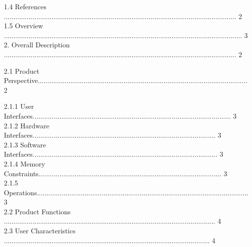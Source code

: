 \documentclass[10pt,draftclsnofoot,onecolumn]{IEEEtran}
\newcommand\tab[1][1cm]{\hspace*{#1}}
\begin{document}
                 \vspace{5mm}
     \tab 1.4 References .......................................................................................................................... 2\\
                 \vspace{5mm}
    \tab 1.5 Overview ............................................................................................................................. 3\\
                 \vspace{5mm}
2. Overall Description .......................................................................................................................... 2\\
                 \vspace{5mm}

\tab  2.1 Product Perspective.............................................................................................................. 2\\
                 \vspace{5mm}


                
\tab\tab 2.1.1 User Interfaces........................................................................................................ 3\\
                 \vspace{5mm}
\tab\tab 2.1.2 Hardware Interfaces................................................................................................ 3\\
                 \vspace{5mm}
\tab\tab 2.1.3 Software Interfaces................................................................................................. 3\\
                 \vspace{5mm}
\tab\tab 2.1.4 Memory Constraints................................................................................................ 3\\
                 \vspace{5mm}
\tab\tab 2.1.5 Operations............................................................................................................... 3\\
                 \vspace{5mm}
\tab 2.2 Product Functions ............................................................................................................... 4\\
                 \vspace{5mm}
\tab 2.3 User Characteristics ............................................................................................................ 4\\
                 \vspace{5mm}
                 
\end{document}
